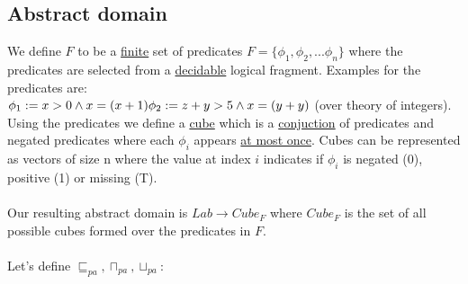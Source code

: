 \subsection{Abstract domain}
We define $F$ to be a \underline{finite} set of predicates $F=\{\phi_1, \phi_2,... \phi_n\}$ where the predicates are selected from a \underline{decidable} logical fragment. Examples for the predicates are: \\$\phi_1 := x > 0 \wedge x = (x+1)\\ \phi_2:=z+y>5 \wedge x=(y+y)$ (over theory of integers).\\
Using the predicates we define a \underline{cube} which is a \underline{conjuction} of predicates and negated predicates where each $\phi_i$ appears \underline{at most once}. Cubes can be represented as vectors of size n where the value at index $i$ indicates if $\phi_i$ is negated (0), positive (1) or missing (T).\\ \\
Our resulting abstract domain is $Lab \to Cube_F$ where $Cube_F$ is the set of all possible cubes formed over the predicates in $F$.\\ \\ 
Let's define $\sqsubseteq_{pa}, \sqcap_{pa}, \sqcup_{pa}$:
